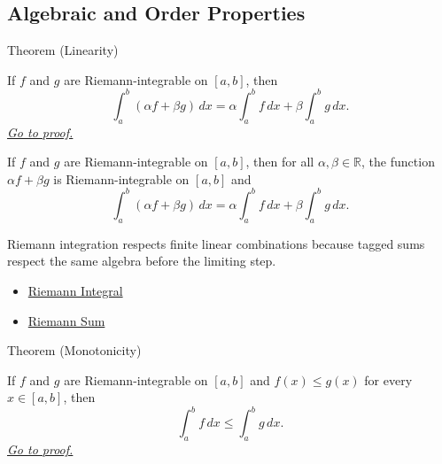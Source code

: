 \subsection*{Algebraic and Order Properties}

\begin{theorembox}{Theorem (Linearity)}
\begin{theorem}
\label{thm:riemann-integral-linearity}
If \(f\) and \(g\) are Riemann-integrable on \([a,b]\), then
\[
  \int_a^b(\alpha f+\beta g)\,dx
  =
  \alpha\int_a^b f\,dx+\beta\int_a^b g\,dx .
\]
\hyperref[prf:riemann-integral-linearity]{\textit{Go to proof.}}
\end{theorem}
\end{theorembox}

\begin{remark*}
If \(f\) and \(g\) are Riemann-integrable on \([a,b]\), then for all
\(\alpha,\beta\in\mathbb R\), the function \(\alpha f+\beta g\) is
Riemann-integrable on \([a,b]\) and
\[
  \int_a^b(\alpha f+\beta g)\,dx
  =
  \alpha\int_a^b f\,dx+\beta\int_a^b g\,dx .
\]
\end{remark*}

\begin{remark*}[Interpretation]
Riemann integration respects finite linear combinations because tagged sums
respect the same algebra before the limiting step.
\end{remark*}

\begin{dependencies}
\begin{itemize}
  \item \hyperref[def:riemann-integral]{Riemann Integral}
  \item \hyperref[def:riemann-sum]{Riemann Sum}
\end{itemize}
\end{dependencies}

\begin{theorembox}{Theorem (Monotonicity)}
\begin{theorem}
\label{thm:riemann-integral-monotonicity}
If \(f\) and \(g\) are Riemann-integrable on \([a,b]\) and \(f(x)\le g(x)\)
for every \(x\in[a,b]\), then
\[
  \int_a^b f\,dx\le \int_a^b g\,dx .
\]
\hyperref[prf:riemann-integral-monotonicity]{\textit{Go to proof.}}
\end{theorem}
\end{theorembox}

